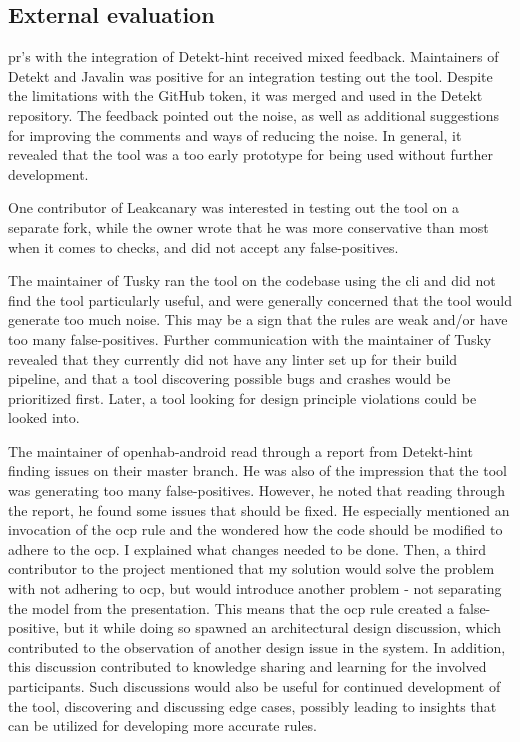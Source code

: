 \documentclass{report}
\begin{document}
\subsection{External evaluation}
\label{evaluation-open-source}

\gls{pr}'s with the integration of Detekt-hint received mixed feedback. Maintainers of Detekt and Javalin was positive for an integration testing out the tool. Despite the limitations with the GitHub token, it was merged and used in the Detekt repository. The feedback pointed out the noise, as well as additional suggestions for improving the comments and ways of reducing the noise. In general, it revealed that the tool was a too early prototype for being used without further development.

One contributor of Leakcanary was interested in testing out the tool on a separate fork, while the owner wrote that he was more conservative than most when it comes to checks, and did not accept any false-positives. 

The maintainer of Tusky\cite{tusky} ran the tool on the codebase using the \gls{cli} and did not find the tool particularly useful, and were generally concerned that the tool would generate too much noise. This may be a sign that the rules are weak and/or have too many false-positives. Further communication with the maintainer of Tusky revealed that they currently did not have any linter set up for their build pipeline, and that a tool discovering possible bugs and crashes would be prioritized first. Later, a tool looking for design principle violations could be looked into.

The maintainer of openhab-android\cite{openhab} read through a report from Detekt-hint finding issues on their master branch. He was also of the impression that the tool was generating too many false-positives. However, he noted that reading through the report, he found some issues that should be fixed. He especially mentioned an invocation of the \gls{ocp} rule and the wondered how the code should be modified to adhere to the \gls{ocp}. I explained what changes needed to be done. Then, a third contributor to the project mentioned that my solution would solve the problem with not adhering to \gls{ocp}, but would introduce another problem - not separating the model from the presentation. This means that the \gls{ocp} rule created a false-positive, but it while doing so spawned an architectural design discussion, which contributed to the observation of another design issue in the system. In addition, this discussion contributed to knowledge sharing and learning for the involved participants. Such discussions would also be useful for continued development of the tool, discovering and discussing edge cases, possibly leading to insights that can be utilized for developing more accurate rules. 
\end{document}
